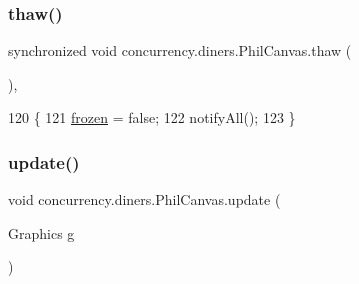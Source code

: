 \subsubsection{\texorpdfstring{thaw()}{thaw()}}
{\footnotesize\ttfamily synchronized void concurrency.\+diners.\+Phil\+Canvas.\+thaw (\begin{DoxyParamCaption}{ }\end{DoxyParamCaption})\hspace{0.3cm}{\ttfamily [inline]}, {\ttfamily [package]}}


\begin{DoxyCode}
120                              \{
121         \mbox{\hyperlink{classconcurrency_1_1diners_1_1_phil_canvas_a0579ad1dffdd10626026d52e95d0d86a}{frozen}} = \textcolor{keyword}{false};
122         notifyAll();
123     \}
\end{DoxyCode}
\mbox{\label{classconcurrency_1_1diners_1_1_phil_canvas_a504bf6cf1499dcfb022344ca1991080f}} 
\subsubsection{\texorpdfstring{update()}{update()}}
{\footnotesize\ttfamily void concurrency.\+diners.\+Phil\+Canvas.\+update (\begin{DoxyParamCaption}\item[{Graphics}]{g }\end{DoxyParamCaption})\hspace{0.3cm}{\ttfamily [inline]}}


